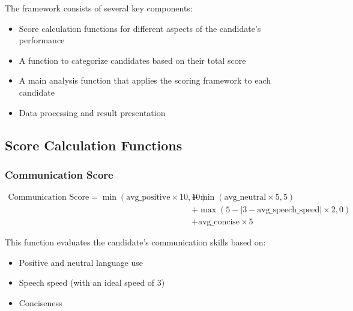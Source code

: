 \documentclass{article}
\begin{document}
The framework consists of several key components:

\begin{itemize}
    \item Score calculation functions for different aspects of the candidate's performance
    \item A function to categorize candidates based on their total score
    \item A main analysis function that applies the scoring framework to each candidate
    \item Data processing and result presentation
\end{itemize}

\subsection{Score Calculation Functions}

\subsubsection{Communication Score}

\small
\begin{equation}
    \begin{aligned}
        \text{Communication Score} = \min(\text{avg\_positive} \times 10, 10)
        &+ \min(\text{avg\_neutral} \times 5, 5) \\
        &+ \max(5 - |3 - \text{avg\_speech\_speed}| \times 2, 0) \\
        &+ \text{avg\_concise} \times 5
    \end{aligned}
\end{equation}
\normalsize





This function evaluates the candidate's communication skills based on:
\begin{itemize}
    \item Positive and neutral language use
    \item Speech speed (with an ideal speed of 3)
    \item Conciseness
\end{itemize}
\end{document}
